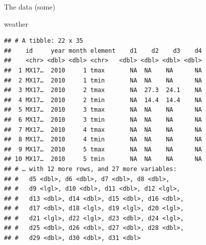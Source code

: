 \documentclass[ignorenonframetext,]{beamer}
\newenvironment{Shaded}{\begin{snugshade}}{\end{snugshade}}
\newcommand{\NormalTok}[1]{#1}
\begin{document}
\begin{frame}[fragile]{The data (some)}
\protect\hypertarget{the-data-some-3}{}

\begin{Shaded}
\begin{Highlighting}[]
\NormalTok{weather}
\end{Highlighting}
\end{Shaded}

\begin{verbatim}
## # A tibble: 22 x 35
##    id     year month element    d1    d2    d3    d4
##    <chr> <dbl> <dbl> <chr>   <dbl> <dbl> <dbl> <dbl>
##  1 MX17…  2010     1 tmax       NA  NA    NA      NA
##  2 MX17…  2010     1 tmin       NA  NA    NA      NA
##  3 MX17…  2010     2 tmax       NA  27.3  24.1    NA
##  4 MX17…  2010     2 tmin       NA  14.4  14.4    NA
##  5 MX17…  2010     3 tmax       NA  NA    NA      NA
##  6 MX17…  2010     3 tmin       NA  NA    NA      NA
##  7 MX17…  2010     4 tmax       NA  NA    NA      NA
##  8 MX17…  2010     4 tmin       NA  NA    NA      NA
##  9 MX17…  2010     5 tmax       NA  NA    NA      NA
## 10 MX17…  2010     5 tmin       NA  NA    NA      NA
## # … with 12 more rows, and 27 more variables:
## #   d5 <dbl>, d6 <dbl>, d7 <dbl>, d8 <dbl>,
## #   d9 <lgl>, d10 <dbl>, d11 <dbl>, d12 <lgl>,
## #   d13 <dbl>, d14 <dbl>, d15 <dbl>, d16 <dbl>,
## #   d17 <dbl>, d18 <lgl>, d19 <lgl>, d20 <lgl>,
## #   d21 <lgl>, d22 <lgl>, d23 <dbl>, d24 <lgl>,
## #   d25 <dbl>, d26 <dbl>, d27 <dbl>, d28 <dbl>,
## #   d29 <dbl>, d30 <dbl>, d31 <dbl>
\end{verbatim}

\end{frame}
\end{document}
